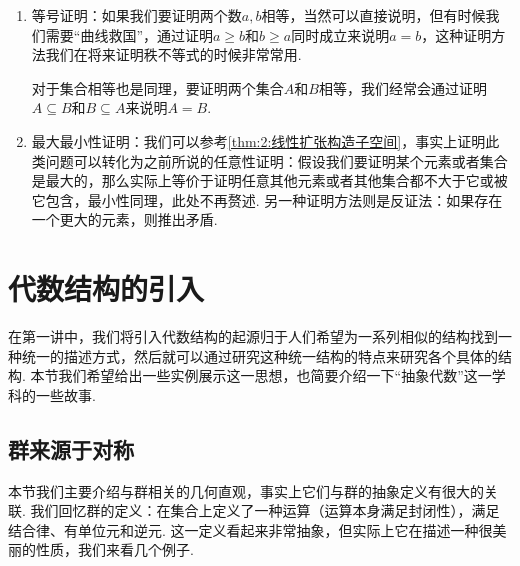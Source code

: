 \begin{enumerate}
    \item 等号证明：如果我们要证明两个数$a,b$相等，当然可以直接说明，但有时候我们需要``曲线救国''，通过证明$a\geqslant b$和$b\geqslant a$同时成立来说明$a=b$，这种证明方法我们在将来证明秩不等式的时候非常常用.

          对于集合相等也是同理，要证明两个集合$A$和$B$相等，我们经常会通过证明$A\subseteq B$和$B\subseteq A$来说明$A=B$.

    \item 最大最小性证明：我们可以参考\autoref{thm:2:线性扩张构造子空间}，事实上证明此类问题可以转化为之前所说的任意性证明：假设我们要证明某个元素或者集合是最大的，那么实际上等价于证明任意其他元素或者其他集合都不大于它或被它包含，最小性同理，此处不再赘述. 另一种证明方法则是反证法：如果存在一个更大的元素，则推出矛盾.
\end{enumerate}

\section{代数结构的引入}

在第一讲中，我们将引入代数结构的起源归于人们希望为一系列相似的结构找到一种统一的描述方式，然后就可以通过研究这种统一结构的特点来研究各个具体的结构. 本节我们希望给出一些实例展示这一思想，也简要介绍一下``抽象代数''这一学科的一些故事.

\subsection{群来源于对称}

本节我们主要介绍与群相关的几何直观，事实上它们与群的抽象定义有很大的关联. 我们回忆群的定义：在集合上定义了一种运算（运算本身满足封闭性），满足结合律、有单位元和逆元. 这一定义看起来非常抽象，但实际上它在描述一种很美丽的性质，我们来看几个例子.

